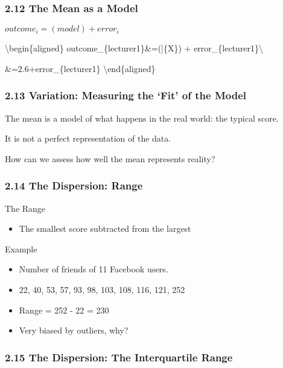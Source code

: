 \documentclass[]{article}
\providecommand{\tightlist}{%
  \setlength{\itemsep}{0pt}\setlength{\parskip}{0pt}}
\begin{document}
\hypertarget{the-mean-as-a-model}{%
\subsubsection{2.12 The Mean as a Model}\label{the-mean-as-a-model}}

\(outcome_i = (model) + error_i\)

\textbackslash{}begin\{aligned\} outcome\_\{lecturer1\}\&=(\bar\{X\}) +
error\_\{lecturer1\}\textbackslash{}

\&=2.6+error\_\{lecturer1\} \textbackslash{}end\{aligned\}

\hypertarget{variation-measuring-the-fit-of-the-model}{%
\subsubsection{2.13 Variation: Measuring the `Fit' of the
Model}\label{variation-measuring-the-fit-of-the-model}}

The mean is a model of what happens in the real world: the typical
score.

It is not a perfect representation of the data.

How can we assess how well the mean represents reality?

\hypertarget{the-dispersion-range}{%
\subsubsection{2.14 The Dispersion: Range}\label{the-dispersion-range}}

The Range

\begin{itemize}
\tightlist
\item
  The smallest score subtracted from the largest
\end{itemize}

Example

\begin{itemize}
\tightlist
\item
  Number of friends of 11 Facebook users.
\item
  22, 40, 53, 57, 93, 98, 103, 108, 116, 121, 252
\item
  Range = 252 - 22 = 230
\item
  Very biased by outliers, why?
\end{itemize}

\hypertarget{the-dispersion-the-interquartile-range}{%
\subsubsection{2.15 The Dispersion: The Interquartile
Range}\label{the-dispersion-the-interquartile-range}}
\end{document}
